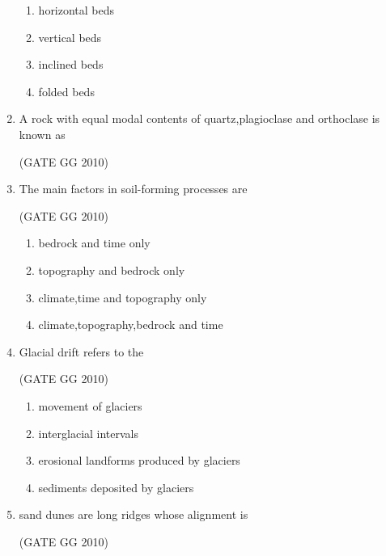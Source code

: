 \documentclass[journal]{IEEEtran}
\begin{document}
\begin{enumerate}[start=1]
\begin{enumerate}
    \item horizontal beds
    \item vertical beds
    \item inclined beds
    \item folded beds
\end{enumerate}

\item A rock with equal modal contents of quartz,plagioclase and orthoclase is known as

\hfill{(GATE GG 2010)}

\begin{enumerate}
\end{enumerate}


\item   The main factors in soil-forming processes are

\hfill{(GATE GG 2010)}

\begin{enumerate}
\item bedrock and time only
\item topography and bedrock only
\item climate,time and topography only
\item climate,topography,bedrock and time
\end{enumerate}


\item  Glacial drift refers to the

\hfill{(GATE GG 2010)}

\begin{enumerate}
\item movement of glaciers
\item interglacial intervals
\item erosional landforms produced by glaciers
\item sediments deposited by glaciers
\end{enumerate}


\item  sand dunes are long ridges whose alignment is

\hfill{(GATE GG 2010)}


\end{enumerate}
\end{document}
